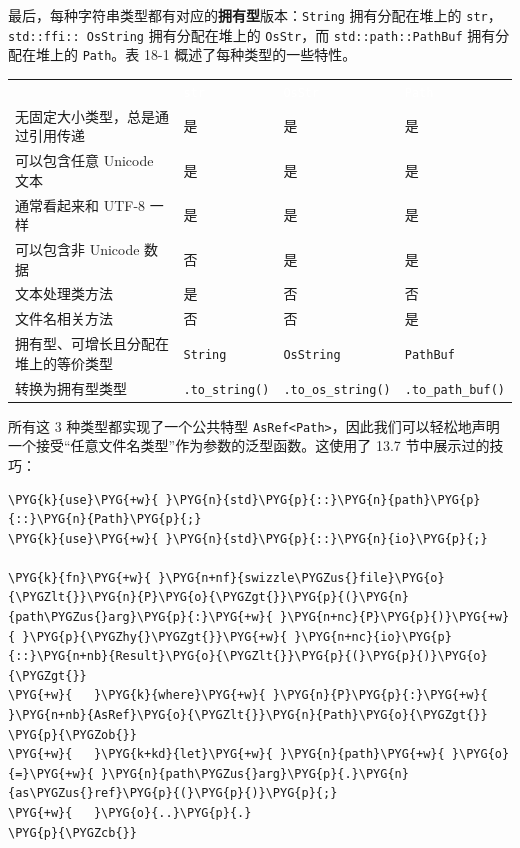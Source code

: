 最后，每种字符串类型都有对应的\textbf{拥有型}版本：\texttt{String} 拥有分配在堆上的 \texttt{str}，\texttt{std::ffi:: OsString} 拥有分配在堆上的 \texttt{OsStr}，而 \texttt{std::path::PathBuf} 拥有分配在堆上的 \texttt{Path}。表 18-1 概述了每种类型的一些特性。


\myTableBegin
\begin{tabularx}{\textwidth}{@{}>{\hsize=0.894\hsize\raggedright\arraybackslash}X>{\hsize=0.983\hsize\raggedright\arraybackslash}X>{\hsize=1.073\hsize\raggedright\arraybackslash}X>{\hsize=1.050\hsize\raggedright\arraybackslash}X@{}}
\rowcolor{tabhead}\textcolor{white}{} & \textcolor{white}{\texttt{str}} & \textcolor{white}{\texttt{OsStr}} & \textcolor{white}{\texttt{Path}} \\
无固定大小类型，总是通过引用传递 & 是 & 是 & 是 \\
可以包含任意 Unicode 文本 & 是 & 是 & 是 \\
通常看起来和 UTF-8 一样 & 是 & 是 & 是 \\
可以包含非 Unicode 数据 & 否 & 是 & 是 \\
文本处理类方法 & 是 & 否 & 否 \\
文件名相关方法 & 否 & 否 & 是 \\
拥有型、可增长且分配在堆上的等价类型 & \texttt{String} & \texttt{OsString} & \texttt{PathBuf} \\
转换为拥有型类型 & \texttt{.to\_string()} & \texttt{.to\_os\_string()} & \texttt{.to\_path\_buf()} \\
\end{tabularx}
\myTableEnd

所有这 3 种类型都实现了一个公共特型 \texttt{AsRef<Path>}，因此我们可以轻松地声明一个接受“任意文件名类型”作为参数的泛型函数。这使用了 13.7 节中展示过的技巧：

\begin{Verbatim}[commandchars=\\\{\},breaklines=true,breakanywhere=true,fontsize=\codefont,xleftmargin=17bp]
\PYG{k}{use}\PYG{+w}{ }\PYG{n}{std}\PYG{p}{::}\PYG{n}{path}\PYG{p}{::}\PYG{n}{Path}\PYG{p}{;}
\PYG{k}{use}\PYG{+w}{ }\PYG{n}{std}\PYG{p}{::}\PYG{n}{io}\PYG{p}{;}

\PYG{k}{fn}\PYG{+w}{ }\PYG{n+nf}{swizzle\PYGZus{}file}\PYG{o}{\PYGZlt{}}\PYG{n}{P}\PYG{o}{\PYGZgt{}}\PYG{p}{(}\PYG{n}{path\PYGZus{}arg}\PYG{p}{:}\PYG{+w}{ }\PYG{n+nc}{P}\PYG{p}{)}\PYG{+w}{ }\PYG{p}{\PYGZhy{}\PYGZgt{}}\PYG{+w}{ }\PYG{n+nc}{io}\PYG{p}{::}\PYG{n+nb}{Result}\PYG{o}{\PYGZlt{}}\PYG{p}{(}\PYG{p}{)}\PYG{o}{\PYGZgt{}}
\PYG{+w}{   }\PYG{k}{where}\PYG{+w}{ }\PYG{n}{P}\PYG{p}{:}\PYG{+w}{ }\PYG{n+nb}{AsRef}\PYG{o}{\PYGZlt{}}\PYG{n}{Path}\PYG{o}{\PYGZgt{}}
\PYG{p}{\PYGZob{}}
\PYG{+w}{   }\PYG{k+kd}{let}\PYG{+w}{ }\PYG{n}{path}\PYG{+w}{ }\PYG{o}{=}\PYG{+w}{ }\PYG{n}{path\PYGZus{}arg}\PYG{p}{.}\PYG{n}{as\PYGZus{}ref}\PYG{p}{(}\PYG{p}{)}\PYG{p}{;}
\PYG{+w}{   }\PYG{o}{..}\PYG{p}{.}
\PYG{p}{\PYGZcb{}}
\end{Verbatim}

